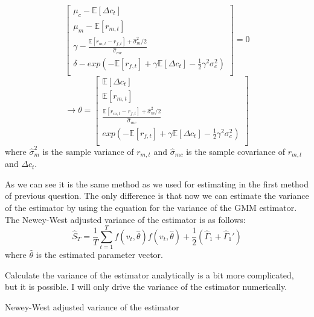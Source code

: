 \begin{enumerate}[(a)]
\begin{equation*}
\begin{bmatrix}
          \mu_c - \mathbb{E} [\Delta c_t] \\
          \mu_m - \mathbb{E} [r_{m,t}] \\
          \gamma - \frac{\mathbb{E} [r_{m,t}- r_{f,t}] + \hat{\sigma}_m^2/2}{\hat{\sigma}_{mc} } \\
          \delta - exp(- \mathbb{E} [r_{f,t}] + \gamma\mathbb{E} [\Delta c_t] - \frac{1}{2}\gamma^2 \sigma_c^2 )  \\
        \end{bmatrix} = 0
      \end{equation*}
      \begin{equation*}
        \rightarrow  \theta = \begin{bmatrix}
          \mathbb{E} [\Delta c_t] \\
          \mathbb{E} [r_{m,t}] \\
          \frac{\mathbb{E} [r_{m,t}- r_{f,t}] + \hat{\sigma}_m^2/2}{\hat{\sigma}_{mc} } \\
          exp(- \mathbb{E} [r_{f,t}] + \gamma\mathbb{E} [\Delta c_t] - \frac{1}{2}\gamma^2 \sigma_c^2 )  \\
        \end{bmatrix}
      \end{equation*}
      where $\hat{\sigma}_m^2$ is the sample variance of $r_{m,t}$ and $\hat{\sigma}_{mc}$ is the sample covariance of $r_{m,t}$ and $\Delta c_t$.

      As we can see it is the same method as we used for estimating in the first method of previous question. The only difference is that now we can estimate the variance of the estimator by using the equation for the variance of the GMM estimator. The Newey-West adjusted variance of the estimator is as follows:    
      \begin{equation*}
        \hat{S}_T = \frac{1}{T} \sum_{t=1}^T f(v_t,\hat{\theta})f(v_t,\hat{\theta}) + \frac{1}{2}(\hat{\Gamma}_1 + \hat{\Gamma}_1')
      \end{equation*}
      where $\hat{\theta}$ is the estimated parameter vector. 

      Calculate the variance of the estimator analytically is a bit more complicated, but it is possible. I will only drive the variance of the estimator numerically. 
      \begin{table}[htbp!]
        \centering
        \caption{Newey-West adjusted variance of the estimator}
        \label{tab:1d}
        
      \end{table}


\end{enumerate}
